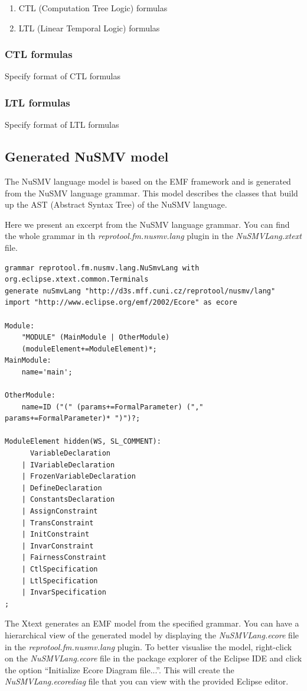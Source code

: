 \begin{enumerate}
 \item CTL (Computation Tree Logic) formulas
 \item LTL (Linear Temporal Logic) formulas
\end{enumerate}

\subsubsection{CTL formulas}
Specify format of CTL formulas

\subsubsection{LTL formulas}
Specify format of LTL formulas

\subsection{Generated NuSMV model}

The NuSMV language model is based on the EMF framework and is generated from the NuSMV language grammar.
This model describes the classes that build up the AST (Abstract Syntax Tree) of the NuSMV language.

Here we present an excerpt from the NuSMV language grammar. You can find the whole grammar in th
\emph{reprotool.fm.nusmv.lang} plugin in the \emph{NuSMVLang.xtext} file.

\begin{lstlisting}[language=XtextGrammar]
grammar reprotool.fm.nusmv.lang.NuSmvLang with org.eclipse.xtext.common.Terminals
generate nuSmvLang "http://d3s.mff.cuni.cz/reprotool/nusmv/lang"
import "http://www.eclipse.org/emf/2002/Ecore" as ecore

Module:
	"MODULE" (MainModule | OtherModule)
	(moduleElement+=ModuleElement)*;
MainModule:
	name='main';

OtherModule:
	name=ID ("(" (params+=FormalParameter) ("," params+=FormalParameter)* ")")?;

ModuleElement hidden(WS, SL_COMMENT):
	  VariableDeclaration
	| IVariableDeclaration
	| FrozenVariableDeclaration
	| DefineDeclaration
	| ConstantsDeclaration
	| AssignConstraint
	| TransConstraint
	| InitConstraint
	| InvarConstraint
	| FairnessConstraint
	| CtlSpecification
	| LtlSpecification
	| InvarSpecification
;
\end{lstlisting}

The Xtext generates an EMF model from the specified grammar. You can have a hierarchical view of the generated model by displaying the
\emph{NuSMVLang.ecore} file in the \emph{reprotool.fm.nusmv.lang} plugin. To better visualise the model, right-click on the \emph{NuSMVLang.ecore} file in
the package explorer of the Eclipse IDE and click the option ``Initialize Ecore Diagram file...''. This will create the \emph{NuSMVLang.ecorediag} file that you can view with the provided Eclipse editor.

